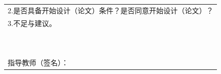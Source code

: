\documentclass[supercite]{Experimental_Report}
\theoremstyle{definition}
\begin{document}
\begin{table}[htbp]
{{\begin{tabular}{|cccccc|}
\multicolumn{6}{|l|}{{2.是否具备开始设计（论文）条件？是否同意开始设计（论文）？ }}   \\
\multicolumn{6}{|l|}{{3.不足与建议。}}  \\
\hline
\multicolumn{6}{|c|}{{\color[HTML]{FF0000} }}                                                                                                                                           \\
\multicolumn{6}{|c|}{{\color[HTML]{FF0000} }}                                                                                                                                           \\
\multicolumn{6}{|c|}{{\color[HTML]{FF0000} }}                                                                                                                                           \\
\multicolumn{6}{|c|}{{\color[HTML]{FF0000} }}                                                                                                                                           \\
\multicolumn{6}{|c|}{{\color[HTML]{FF0000} }}                                                                                                                                           \\
\multicolumn{6}{|c|}{{\color[HTML]{FF0000} }}                                                                                                                                                                                                                    \\
\multicolumn{6}{|c|}{{\color[HTML]{FF0000} }}                                                                                                                                           \\
\multicolumn{6}{|c|}{{\color[HTML]{FF0000} }}                                                                                                                                           \\
\multicolumn{6}{|c|}{\multirow{-15}{*}{{\color[HTML]{FF0000} }}}                                                                                                                        \\ \hline
\multicolumn{6}{|l|}{}                                                                                                                                                                  \\
\multicolumn{6}{|l|}{\multirow{-2}{*}{指导教师（签名）：}}                                                                                                                                       \\ 

\end{tabular}}}
\end{table}
\end{document}

